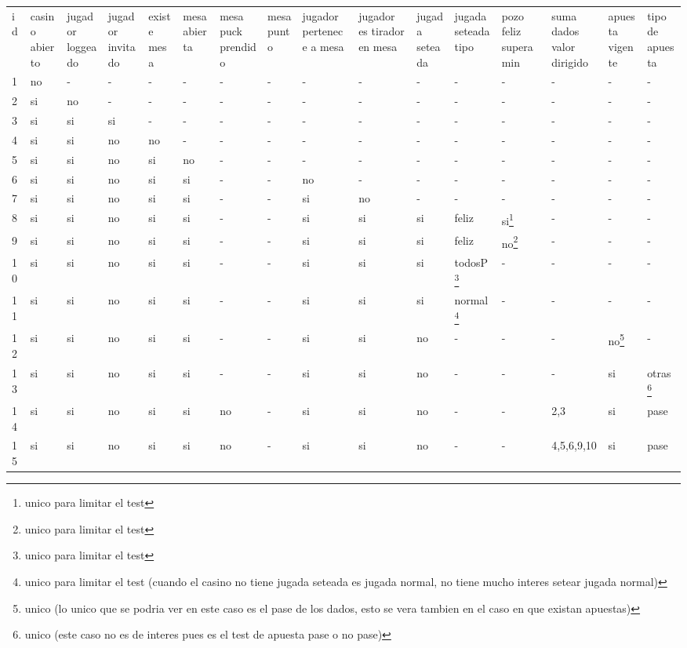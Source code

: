 \documentclass[a4paper, 10pt, notitlepage]{article}
\begin{document}
\begin{landscape}
\begin{tabularx}{1.5\textheight}{|X|X|X|X|X|X|X|X|X|X|X|X|X|X|X|X|}
id	&	casino abierto	&	jugador loggeado	&	jugador invitado	&	existe mesa	&	mesa abierta	&	mesa puck prendido	&	mesa punto	&	jugador pertenece a mesa	&	jugador es tirador en mesa	&	jugada seteada	&	jugada seteada tipo	&	pozo feliz supera min	&	suma dados
valor dirigido	&	apuesta vigente	&	tipo de apuesta\\
1	&	no	&	-	&	-	&	-	&	-	&	-	&	-	&	-	&	-	&	-	&	-	&	-	&	-	&	-	&	-\\
2	&	si	&	no	&	-	&	-	&	-	&	-	&	-	&	-	&	-	&	-	&	-	&	-	&	-	&	-	&	-\\
3	&	si	&	si	&	si	&	-	&	-	&	-	&	-	&	-	&	-	&	-	&	-	&	-	&	-	&	-	&	-\\
4	&	si	&	si	&	no	&	no	&	-	&	-	&	-	&	-	&	-	&	-	&	-	&	-	&	-	&	-	&	-\\
5	&	si	&	si	&	no	&	si	&	no	&	-	&	-	&	-	&	-	&	-	&	-	&	-	&	-	&	-	&	-\\
6	&	si	&	si	&	no	&	si	&	si	&	-	&	-	&	no	&	-	&	-	&	-	&	-	&	-	&	-	&	-\\
7	&	si	&	si	&	no	&	si	&	si	&	-	&	-	&	si	&	no	&	-	&	-	&	-	&	-	&	-	&	-\\
8	&	si	&	si	&	no	&	si	&	si	&	-	&	-	&	si	&	si	&	si	&	feliz	&	si\footnote{unico para limitar el test}	&	-	&	-	&	-\\
9	&	si	&	si	&	no	&	si	&	si	&	-	&	-	&	si	&	si	&	si	&	feliz	&	no\footnote{unico para limitar el test}	&	-	&	-	&	-\\
10	&	si	&	si	&	no	&	si	&	si	&	-	&	-	&	si	&	si	&	si	&	todosP\footnote{unico para limitar el test}	&	-	&	-	&	-	&	-\\
11	&	si	&	si	&	no	&	si	&	si	&	-	&	-	&	si	&	si	&	si	&	normal\footnote{unico para limitar el test (cuando el casino no tiene jugada seteada es jugada normal, no tiene mucho interes setear jugada normal)}	&	-	&	-	&	-	&	-\\
12	&	si	&	si	&	no	&	si	&	si	&	-	&	-	&	si	&	si	&	no	&	-	&	-	&	-	&	no\footnote{unico (lo unico que se podria ver en este caso es el pase de los dados, esto se vera tambien en el caso en que existan apuestas)}	&	-\\
13	&	si	&	si	&	no	&	si	&	si	&	-	&	-	&	si	&	si	&	no	&	-	&	-	&	-	&	si	&	otras\footnote{unico (este caso no es de interes pues es el test de apuesta pase o no pase)}\\
14	&	si	&	si	&	no	&	si	&	si	&	no	&	-	&	si	&	si	&	no	&	-	&	-	&	2,3	&	si	&	pase\\
15	&	si	&	si	&	no	&	si	&	si	&	no	&	-	&	si	&	si	&	no	&	-	&	-	&	4,5,6,9,10	&	si	&	pase\\

\end{tabularx}
\end{landscape}
\end{document}
